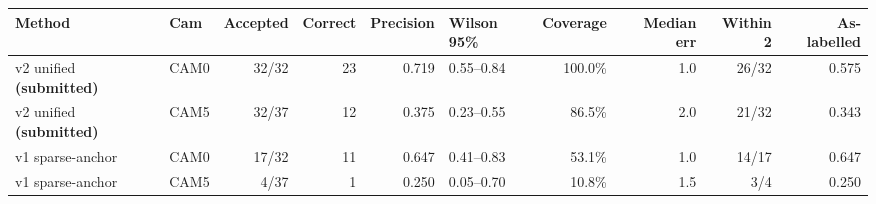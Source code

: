 \begin{tabularx}{\textwidth}{@{}llrrrlrrrr@{}}
\toprule
Method & Cam & Accepted & Correct & Precision & Wilson 95\% & Coverage & Median err & Within 2 & As-labelled \\
\midrule
v2 unified \textbf{(submitted)} & CAM0 & 32/32 & 23 & 0.719 & 0.55--0.84 & 100.0\% & 1.0 & 26/32 & 0.575 \\
v2 unified \textbf{(submitted)} & CAM5 & 32/37 & 12 & 0.375 & 0.23--0.55 & 86.5\% & 2.0 & 21/32 & 0.343 \\
v1 sparse-anchor & CAM0 & 17/32 & 11 & 0.647 & 0.41--0.83 & 53.1\% & 1.0 & 14/17 & 0.647 \\
v1 sparse-anchor & CAM5 & 4/37 & 1 & 0.250 & 0.05--0.70 & 10.8\% & 1.5 & 3/4 & 0.250 \\
\bottomrule
\end{tabularx}
